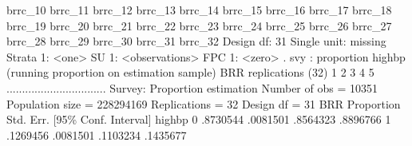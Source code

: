                brrc_10 brrc_11 brrc_12 brrc_13 brrc_14 brrc_15 brrc_16
               brrc_17 brrc_18 brrc_19 brrc_20 brrc_21 brrc_22 brrc_23
               brrc_24 brrc_25 brrc_26 brrc_27 brrc_28 brrc_29 brrc_30
               brrc_31 brrc_32
    Design df: 31
  Single unit: missing
     Strata 1: <one>
         SU 1: <observations>
        FPC 1: <zero>
{\smallskip}
. svy : proportion highbp
(running proportion on estimation sample)
{\smallskip}
BRR replications (32)
 1  2  3  4  5
................................
{\smallskip}
Survey: Proportion estimation    Number of obs    =      10351
                                 Population size  =  228294169
                                 Replications     =         32
                                 Design df        =         31
{\smallskip}
             {\VBAR}                 BRR
             {\VBAR} Proportion   Std. Err.     [95\% Conf. Interval]
highbp       {\VBAR}
           0 {\VBAR}   .8730544   .0081501      .8564323    .8896766
           1 {\VBAR}   .1269456   .0081501      .1103234    .1435677
